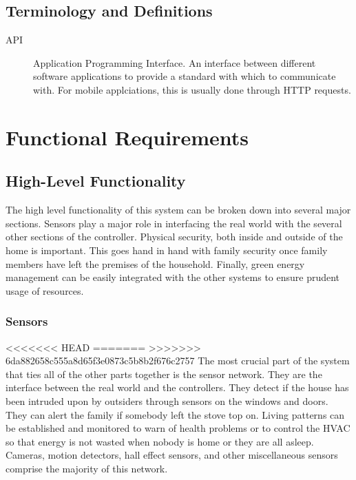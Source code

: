 \documentclass{report}
\begin{document}
\section{Terminology and Definitions}
\begin{description}
\item[API] Application Programming Interface. An interface between different
software applications to provide a standard with which to communicate with. For
mobile applciations, this is usually done through HTTP requests.

\end{description}

\chapter{Functional Requirements}
\label{ch:functional_requirments}
\section{High-Level Functionality}
The high level functionality of this system can be broken down into several
major sections. Sensors play a major role in interfacing the real world with
the several other sections of the controller. Physical security, both inside
and outside of the home is important. This goes hand in hand with family
security once family members have left the premises of the household. Finally,
green energy management can be easily integrated with the other systems to
ensure prudent usage of resources. 

\subsection{Sensors}
<<<<<<< HEAD
=======
>>>>>>> 6da882658c555a8d65f3e0873c5b8b2f676c2757
The most crucial part of the system that ties all of the other parts together
is the sensor network. They are the interface between the real world and the
controllers. They detect if the house has been intruded upon by outsiders
through sensors on the windows and doors. They can alert the family if somebody
left the stove top on. Living patterns can be established and monitored to warn
of health problems or to control the HVAC so that energy is not wasted when
nobody is home or they are all asleep. Cameras, motion detectors, hall effect
sensors, and other miscellaneous sensors comprise the majority of this network.
\end{document}
